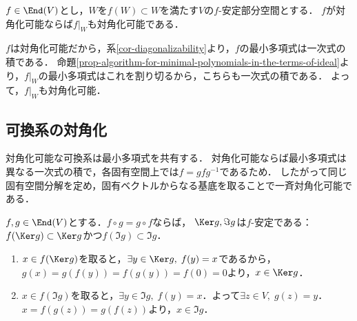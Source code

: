 \documentclass[uplatex, dvipdfmx]{jsreport}
\begin{document}
\begin{corollary}[安定部分空間への遺伝]
    $f\in\End(V)$とし，$W$を$f(W)\subset W$を満たす$V$の$f$-安定部分空間とする．
    $f$が対角化可能ならば$f|_W$も対角化可能である．
\end{corollary}
\begin{Proof}
    $f$は対角化可能だから，系\ref{cor-diagonalizability}より，$f$の最小多項式は一次式の積である．
    命題\ref{prop-algorithm-for-minimal-polynomials-in-the-terms-of-ideal}より，$f|_W$の最小多項式はこれを割り切るから，こちらも一次式の積である．
    よって，$f|_W$も対角化可能．
\end{Proof}

\subsection{可換系の対角化}

\begin{tcolorbox}[colframe=ForestGreen, colback=ForestGreen!10!white,breakable,colbacktitle=ForestGreen!40!white,coltitle=black,fonttitle=\bfseries\sffamily,
title=]
    対角化可能な可換系は最小多項式を共有する．
    対角化可能ならば最小多項式は異なる一次式の積で，各固有空間上では$f=gfg^{-1}$であるため．
    したがって同じ固有空間分解を定め，固有ベクトルからなる基底を取ることで一斉対角化可能である．
\end{tcolorbox}

\begin{lemma}[可換性の必要条件]\label{lemma-commutative}
    $f,g\in\End(V)$とする．$f\circ g=g\circ f$ならば，
    $\Ker g,\Im g$は$f$-安定である：
    $f(\Ker g)\subset\Ker g$かつ$f(\Im g)\subset\Im g$．
\end{lemma}
\begin{Proof}\mbox{}
    \begin{enumerate}
        \item $x\in f(\Ker g)$を取ると，$\exists y\in\Ker g,\;f(y)=x$であるから，$g(x)=g(f(y))=f(g(y))=f(0)=0$より，$x\in\Ker g$．
        \item $x\in f(\Im g)$を取ると，$\exists y\in\Im g,\;f(y)=x$．よって$\exists z\in V,\;g(z)=y$．$x=f(g(z))=g(f(z))$より，$x\in\Im g$．
    \end{enumerate}
\end{Proof}
\end{document}
